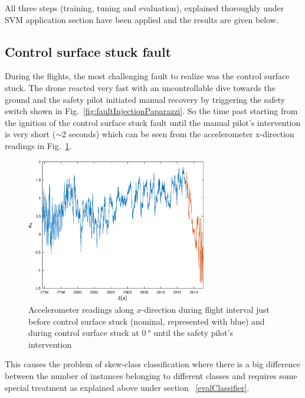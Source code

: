 All three steps (training, tuning and evaluation), explained thoroughly under SVM application section have been applied and the results are given below.

\subsection{Control surface stuck fault}

During the flights, the most challenging fault to realize was the control surface stuck. 
The drone reacted very fast with an uncontrollable dive towards the ground and the safety pilot initiated manual recovery by triggering the safety switch shown in Fig.~\ref{fig:faultInjectionPaparazzi}. 
So the time past starting from the ignition of the control surface stuck fault until the manual pilot's intervention is very short ($\sim$2 seconds) which can be seen from the accelerometer x-direction readings in Fig.~\ref{fig:acc_x}. 


\begin{figure}[h]
\begin{center}
\includegraphics[width=0.7\textwidth]{figures/acc_x}    %
\caption{Accelerometer readings along $x$-direction during flight interval just before control surface stuck (nominal, represented with blue) and during control surface stuck at $\SI{0}{\degree}$ until the safety pilot's intervention} 
\label{fig:acc_x}
\end{center}
\end{figure}

This causes the problem of skew-class classification where there is a big difference between the number of instances belonging to different classes and requires some special treatment as explained above under section ~\ref{evalClassifier}.

